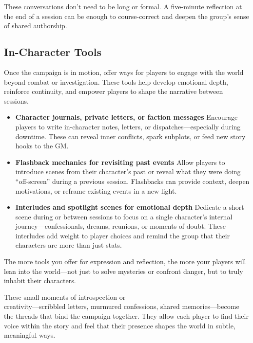 These conversations don’t need to be long or formal. A five-minute reflection at the end of a session can be enough to course-correct and deepen the group’s sense of shared authorship.

\subsection*{In-Character Tools}

Once the campaign is in motion, offer ways for players to engage with the world beyond combat or investigation. These tools help develop emotional depth, reinforce continuity, and empower players to shape the narrative between sessions.

\begin{itemize}
    \item \textbf{Character journals, private letters, or faction messages}  
    Encourage players to write in-character notes, letters, or dispatches—especially during downtime. These can reveal inner conflicts, spark subplots, or feed new story hooks to the GM.

    \item \textbf{Flashback mechanics for revisiting past events}  
    Allow players to introduce scenes from their character’s past or reveal what they were doing “off-screen” during a previous session. Flashbacks can provide context, deepen motivations, or reframe existing events in a new light.

    \item \textbf{Interludes and spotlight scenes for emotional depth}  
    Dedicate a short scene during or between sessions to focus on a single character’s internal journey—confessionals, dreams, reunions, or moments of doubt. These interludes add weight to player choices and remind the group that their characters are more than just stats.
\end{itemize}

The more tools you offer for expression and reflection, the more your players will lean into the world—not just to solve mysteries or confront danger, but to truly inhabit their characters.

These small moments of introspection or\\ creativity—scribbled letters, murmured confessions, shared memories—become the threads that bind the campaign together. They allow each player to find their voice within the story and feel that their presence shapes the world in subtle, meaningful ways.

